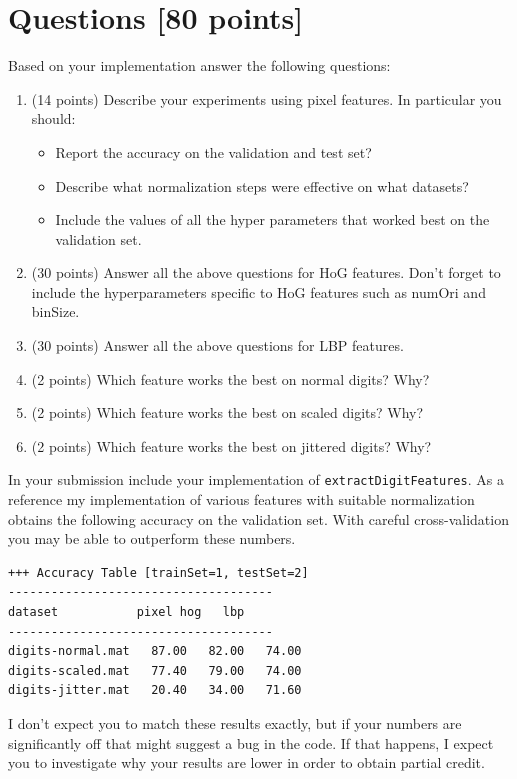 \documentclass[10pt,letterpaper]{article}
\newcommand{\cmd}[1] {{\color{blue}\texttt{#1}}}
\begin{document}
\newpage

\section{Questions [80 points]}
Based on your implementation answer the following questions:

\begin{enumerate}
\item (14 points) Describe your experiments using pixel features. In particular you should:
\begin{itemize}
\item Report the accuracy on the validation and test set? 
\item Describe what normalization steps were effective on what datasets? 
\item Include the values of all the hyper parameters that worked best on the validation set.
\end{itemize}

\item (30 points) Answer all the above questions for HoG features. Don't forget to include the hyperparameters specific to HoG features such as numOri and binSize.
\item (30 points) Answer all the above questions for LBP features.
\item (2 points) Which feature works the best on normal digits? Why?
\item (2 points) Which feature works the best on scaled digits? Why?
\item (2 points) Which feature works the best on jittered digits? Why?
\end{enumerate}

In your submission include your implementation of \cmd{extractDigitFeatures}. As a reference my implementation of various features with suitable normalization obtains the following accuracy on the validation set. With careful cross-validation you may be able to outperform these numbers.

\begin{verbatim}
+++ Accuracy Table [trainSet=1, testSet=2]
-------------------------------------
dataset           pixel hog   lbp	
-------------------------------------
digits-normal.mat	87.00	82.00	74.00	
digits-scaled.mat	77.40	79.00	74.00	
digits-jitter.mat	20.40	34.00	71.60	
\end{verbatim}

 I don't expect you to match these results exactly, but if your numbers are significantly off that might suggest a bug in the code. If that happens, I expect you to investigate why your results are lower in order to obtain partial credit.
\end{document}
